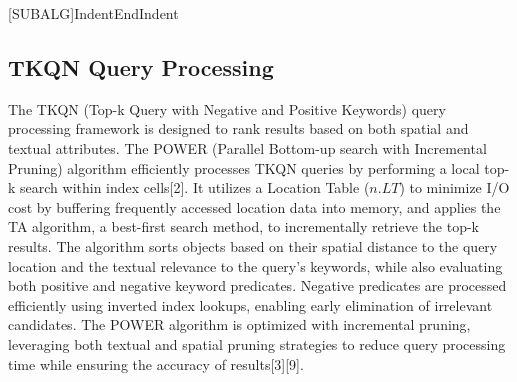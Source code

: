 \documentclass[conference]{IEEEtran}
\begin{document}
[SUBALG]{Indent}{EndIndent}{}{\algorithmicend\ }%

    \subsection{\textbf{TKQN Query Processing}}
    The TKQN (Top-k Query with Negative and Positive Keywords) query processing framework is designed to rank results based on both spatial and textual attributes. The POWER (Parallel Bottom-up search with Incremental Pruning) algorithm efficiently processes TKQN queries by performing a local top-k search within index cells[2]. It utilizes a Location Table ($n.LT$) to minimize I/O cost by buffering frequently accessed location data into memory, and applies the TA algorithm, a best-first search method, to incrementally retrieve the top-k results. The algorithm sorts objects based on their spatial distance to the query location and the textual relevance to the query's keywords, while also evaluating both positive and negative keyword predicates. Negative predicates are processed efficiently using inverted index lookups, enabling early elimination of irrelevant candidates. The POWER algorithm is optimized with incremental pruning, leveraging both textual and spatial pruning strategies to reduce query processing time while ensuring the accuracy of results[3][9]. \\
\end{document}
